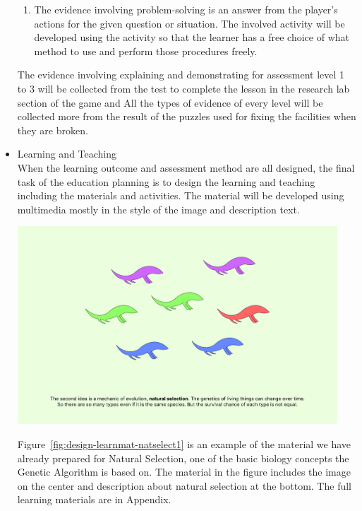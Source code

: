\documentclass[12pt,oneside,openright,a4paper]{cpe-english-project}
\begin{document}
\begin{itemize}
\begin{enumerate}
		\item  The evidence involving problem-solving is an answer from the player's actions for the given question or situation. The involved activity will be developed using the activity so that the learner has a free choice of what method to use and perform those procedures freely.
	\end{enumerate}
	The evidence involving explaining and demonstrating for assessment level 1 to 3 will be collected from the test to complete the lesson in the research lab section of the game and All the types of evidence of every level will be collected more from the result of the puzzles used for fixing the facilities when they are broken.

	\item Learning and Teaching \\
	When the learning outcome and assessment method are all designed, the final task of the education planning is to design the learning and teaching including the materials and activities. The material will be developed using multimedia mostly in the style of the image and description text. 

	\begin{minipage}[c]{\textwidth}\centering
	\includegraphics[width=12cm]{figure/design-learnmat-natselect1.png}
	\label{fig:design-learnmat-natselect1}
	\end{minipage}

	Figure~\ref{fig:design-learnmat-natselect1} is an example of the material we have already prepared for Natural Selection, one of the basic biology concepts the Genetic Algorithm is based on. The material in the figure includes the image on the center and description about natural selection at the bottom. The full learning materials are in Appendix. %


\end{itemize}
\end{document}
